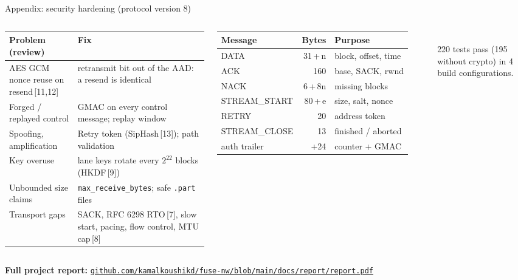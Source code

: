 \documentclass[aspectratio=169,11pt]{beamer}
\newcommand{\rf}[1]{{\scriptsize\,[#1]}}
\begin{document}
\begin{frame}{Appendix: security hardening (protocol version 8)}
  \begin{columns}[T]
    \scriptsize
    \begin{tabular}{@{}p{0.33\linewidth}p{0.63\linewidth}@{}}
      \toprule
      \textbf{Problem (review)} & \textbf{Fix} \\
      \midrule
      AES GCM nonce reuse on resend\rf{11,12} & retransmit bit out of the AAD: a resend is identical \\
      Forged / replayed control & GMAC on every control message; replay window \\
      Spoofing, amplification & Retry token (SipHash\rf{13}); path validation \\
      Key overuse & lane keys rotate every $2^{22}$ blocks (HKDF\rf{9}) \\
      Unbounded size claims & \texttt{max\_receive\_bytes}; safe \texttt{.part} files \\
      Transport gaps & SACK, RFC 6298 RTO\rf{7}, slow start, pacing, flow control, MTU cap\rf{8} \\
      \bottomrule
    \end{tabular}
    \scriptsize
    \begin{tabular}{@{}lrl@{}}
      \toprule
      \textbf{Message} & \textbf{Bytes} & \textbf{Purpose} \\
      \midrule
      DATA & 31\,+\,n & block, offset, time \\
      ACK & 160 & base, SACK, rwnd \\
      NACK & 6\,+\,8n & missing blocks \\
      STREAM\_START & 80\,+\,e & size, salt, nonce \\
      RETRY & 20 & address token \\
      STREAM\_CLOSE & 13 & finished / aborted \\
      auth trailer & +24 & counter + GMAC \\
      \bottomrule
    \end{tabular}\\[2mm]
    220 tests pass (195 without crypto) in 4 build configurations.
  \end{columns}
  \vfill
  \centering\scriptsize
  \textbf{Full project report:}
  \href{https://github.com/kamalkoushikd/fuse-nw/blob/main/docs/report/report.pdf}{\texttt{github.com/kamalkoushikd/fuse-nw/blob/main/docs/report/report.pdf}}
\end{frame}
\end{document}
